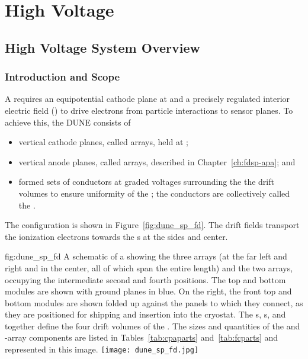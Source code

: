 \chapter{High Voltage}
\label{ch:sp-hv}
\section{High Voltage System Overview}
\label{sec:fdsp-hv-ov}

\subsection{Introduction and Scope}
\label{sec:fdsp-hv-intro}

A  requires an equipotential cathode plane at  and a precisely regulated interior electric field (\efield{}) to drive 
electrons from particle interactions to sensor planes.  To achieve this, the DUNE   consists of 
\begin{itemize}
\item vertical cathode planes, called  arrays, held at ;
\item vertical anode planes, called  arrays, described in Chapter~\ref{ch:fdsp-apa}; and
\item formed sets of conductors at graded voltages surrounding the
 the drift volumes to ensure uniformity of the \efield; the conductors are collectively called the .
\end{itemize}

The \single {} configuration is shown in Figure~\ref{fig:dune_sp_fd}.
The  drift fields transport the ionization electrons 
towards the s at the sides and center.

\begin{dunefigure}
{fig:dune_sp_fd}
{A schematic of a  showing the three  arrays (at the far left and right and in the center, all of which span the entire \sptpclen {} length) and the two  arrays, occupying the intermediate second and fourth positions. The top and bottom  modules are shown with ground planes in blue. 
On the right, the front top and bottom  modules are shown folded up against the  panels to which they connect, as they are positioned for shipping and insertion into the cryostat.  The s, s, and  together define the four drift volumes of the . The sizes and quantities of the  and -array components are listed in Tables~\ref{tab:cpaparts} and~\ref{tab:fcparts} and represented in this image.}
\texttt{[image: dune\_sp\_fd.jpg]}
\end{dunefigure}

